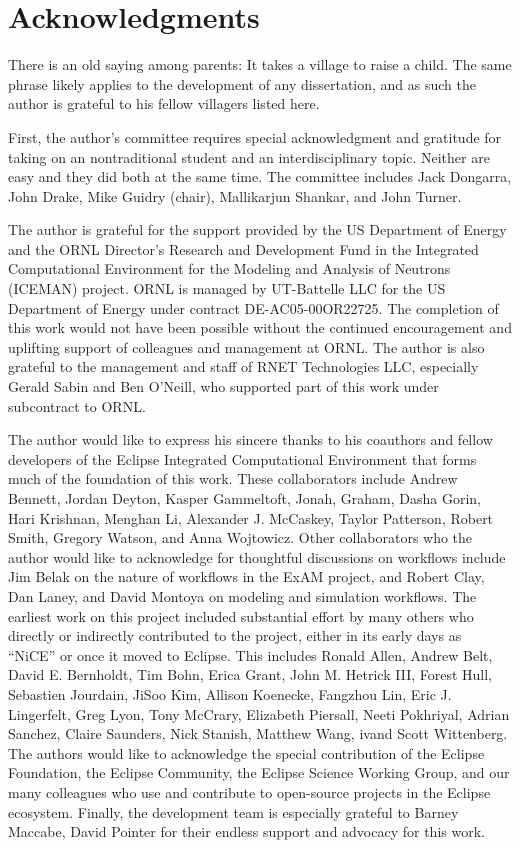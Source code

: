 \chapter*{Acknowledgments}

There is an old saying among parents: It takes a village to raise a child. The
same phrase likely applies to the development of any dissertation, and as such
the author is grateful to his fellow villagers listed here.

First, the author's committee requires special acknowledgment and gratitude
for taking on an nontraditional student and an interdisciplinary topic.
Neither are easy and they did both at the same time. The committee includes Jack
Dongarra, John Drake, Mike Guidry (chair), Mallikarjun Shankar, and John Turner. 

The author is grateful for the support provided by the US Department
of Energy and the ORNL Director’s Research and Development Fund in the
Integrated Computational Environment for the Modeling and Analysis of Neutrons
(ICEMAN) project. ORNL is managed by UT-Battelle LLC for the US Department of
Energy under contract DE-AC05-00OR22725. The completion of this work would not
have been possible without the continued encouragement and uplifting support of
colleagues and management at ORNL. The author is also grateful to the management
and staff of RNET Technologies LLC, especially Gerald Sabin and Ben O'Neill, who
supported part of this work under subcontract to ORNL.

The author would like to express his sincere thanks to his coauthors and
fellow developers of the Eclipse Integrated Computational Environment that
forms much of the foundation of this work. These collaborators include Andrew
Bennett, Jordan Deyton, Kasper Gammeltoft, Jonah, Graham, Dasha Gorin, Hari
Krishnan, Menghan Li, Alexander J. McCaskey, Taylor Patterson, Robert Smith,
Gregory Watson, and Anna Wojtowicz. Other collaborators who the author would
like to acknowledge for thoughtful discussions on workflows include Jim Belak on
the nature of workflows in the ExAM project, and Robert Clay, Dan Laney, and
David Montoya on modeling and simulation workflows. The earliest work on this
project included substantial effort by many others who directly or
indirectly contributed to the project, either in its early days as “NiCE” or
once it moved to Eclipse. This includes Ronald Allen, Andrew Belt, David E.
Bernholdt, Tim Bohn, Erica Grant, John M. Hetrick III, Forest Hull, Sebastien
Jourdain, JiSoo Kim, Allison Koenecke, Fangzhou Lin, Eric J. Lingerfelt, Greg
Lyon, Tony McCrary, Elizabeth Piersall, Neeti Pokhriyal, Adrian Sanchez, Claire
Saunders, Nick Stanish, Matthew Wang, ivand Scott Wittenberg. The authors would
like to acknowledge the special contribution of the Eclipse Foundation, the
Eclipse Community, the Eclipse Science Working Group, and our many colleagues
who use and contribute to open-source projects in the Eclipse ecosystem.
Finally, the development team is especially grateful to Barney Maccabe, David
Pointer for their endless support and advocacy for this work.

